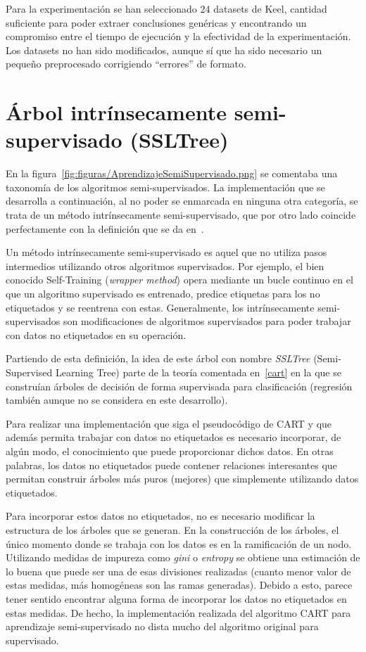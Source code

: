 Para la experimentación se han seleccionado 24 datasets de Keel, cantidad suficiente para poder extraer conclusiones genéricas y encontrando un compromiso entre el tiempo de ejecución y la efectividad de la experimentación. Los datasets no han sido modificados, aunque sí que ha sido necesario un pequeño preprocesado corrigiendo ``errores'' de formato.

\newpage
\section{Árbol intrínsecamente semi-supervisado (SSLTree)}

En la figura~\ref{fig:figuras/AprendizajeSemiSupervisado.png} se comentaba una taxonomía de los algoritmos semi-supervisados. La implementación que se desarrolla a continuación, al no poder se enmarcada en ninguna otra categoría, se trata de un método intrínsecamente semi-supervisado, que por otro lado coincide perfectamente con la definición que se da en~\cite{vanEngelen2020}.

Un método intrínsecamente semi-supervisado es aquel que no utiliza pasos intermedios utilizando otros algoritmos supervisados. Por ejemplo, el bien conocido Self-Training (\textit{wrapper method}) opera mediante un bucle continuo en el que un algoritmo supervisado es entrenado, predice etiquetas para los no etiquetados y se reentrena con estas. Generalmente, los intrínsecamente semi-supervisados son modificaciones de algoritmos supervisados para poder trabajar con datos no etiquetados en su operación.

Partiendo de esta definición, la idea de este árbol con nombre \textit{SSLTree} (Semi-Supervised Learning Tree) parte de la teoría comentada en~\ref{cart} en la que se construían árboles de decisión de forma supervisada para clasificación (regresión también aunque no se considera en este desarrollo).

Para realizar una implementación que siga el pseudocódigo de CART y que además permita trabajar con datos no etiquetados es necesario incorporar, de algún modo, el conocimiento que puede proporcionar dichos datos. En otras palabras, los datos no etiquetados puede contener relaciones interesantes que permitan construir árboles más puros (mejores) que simplemente utilizando datos etiquetados.

Para incorporar estos datos no etiquetados, no es necesario modificar la estructura de los árboles que se generan. En la construcción de los árboles, el único momento donde se trabaja con los datos es en la ramificación de un nodo. Utilizando medidas de impureza como \textit{gini} o \textit{entropy} se obtiene una estimación de lo buena que puede ser una de esas divisiones realizadas (cuanto menor valor de estas medidas, más homogéneas son las ramas generadas). Debido a esto, parece tener sentido encontrar alguna forma de incorporar los datos no etiquetados en estas medidas. De hecho, la implementación realizada del algoritmo CART para aprendizaje semi-supervisado no dista mucho del algoritmo original para supervisado. 

